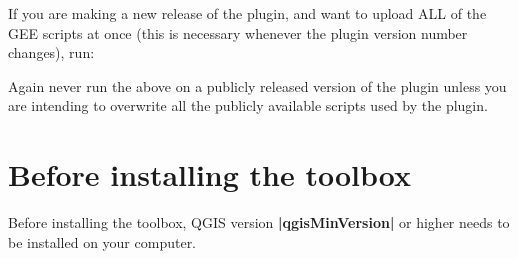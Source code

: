 \documentclass[letterpaper,10pt,english]{sphinxmanual}
\begin{document}
\begin{sphinxVerbatim}[commandchars=\\\{\}]
   
\end{sphinxVerbatim}

\sphinxAtStartPar
If you are making a new release of the plugin, and want to upload ALL of the
GEE scripts at once (this is necessary whenever the plugin version number
changes), run:

\begin{sphinxVerbatim}[commandchars=\\\{\}]
 
\end{sphinxVerbatim}

\sphinxAtStartPar
Again \sphinxhyphen{} never run the above on a publicly released version of the plugin unless
you are intending to overwrite all the publicly available scripts used by the
plugin.

\sphinxstepscope


\chapter{Before installing the toolbox}
\label{\detokenize{Qgis_Plugin/before_installing:before-installing-the-toolbox}}\label{\detokenize{Qgis_Plugin/before_installing:before-installing}}\label{\detokenize{Qgis_Plugin/before_installing::doc}}
\sphinxAtStartPar
Before installing the toolbox, QGIS version {\color{red}\bfseries{}|qgisMinVersion|} or higher
needs to be installed on your computer.
\end{document}
